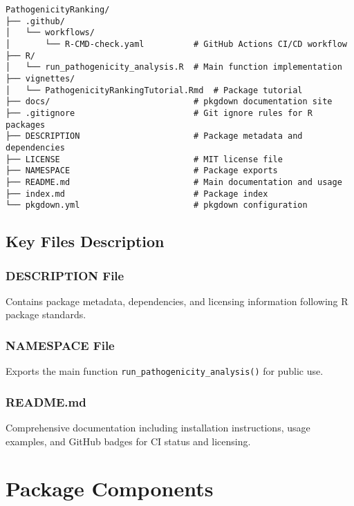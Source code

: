 \documentclass[
  11pt,
]{article}
\begin{document}
\begin{verbatim}
PathogenicityRanking/
├── .github/
│   └── workflows/
│       └── R-CMD-check.yaml          # GitHub Actions CI/CD workflow
├── R/
│   └── run_pathogenicity_analysis.R  # Main function implementation
├── vignettes/
│   └── PathogenicityRankingTutorial.Rmd  # Package tutorial
├── docs/                             # pkgdown documentation site
├── .gitignore                        # Git ignore rules for R packages
├── DESCRIPTION                       # Package metadata and dependencies
├── LICENSE                           # MIT license file
├── NAMESPACE                         # Package exports
├── README.md                         # Main documentation and usage
├── index.md                          # Package index
└── pkgdown.yml                       # pkgdown configuration
\end{verbatim}

\subsection{Key Files Description}\label{key-files-description}

\subsubsection{DESCRIPTION File}\label{description-file}

Contains package metadata, dependencies, and licensing information
following R package standards.

\subsubsection{NAMESPACE File}\label{namespace-file}

Exports the main function \texttt{run\_pathogenicity\_analysis()} for
public use.

\subsubsection{README.md}\label{readme.md}

Comprehensive documentation including installation instructions, usage
examples, and GitHub badges for CI status and licensing.

\newpage

\section{Package Components}\label{package-components}
\end{document}
